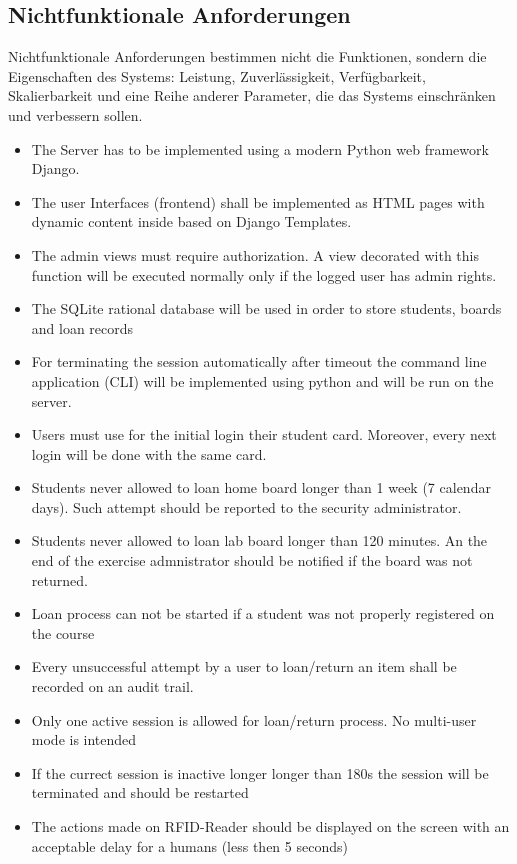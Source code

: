 \subsection{Nichtfunktionale Anforderungen}
Nichtfunktionale Anforderungen bestimmen nicht die Funktionen, sondern die Eigenschaften des Systems: Leistung, Zuverlässigkeit, Verfügbarkeit, Skalierbarkeit und eine Reihe anderer Parameter, die das Systems einschränken und verbessern sollen. 
\label{sec:design:req:non-func}
\begin{itemize}
	\itemsep-1.2em 
	\item The Server has to be implemented using a modern Python web framework Django.
	\item The user Interfaces (frontend) shall be implemented as HTML pages with dynamic content inside based on Django Templates.
	\item The admin views must require authorization. A view decorated with this function will be executed normally only if the logged user has admin rights.
	\item The SQLite rational database will be used in order to store students, boards and loan records
	\item For terminating the session automatically after timeout the command line application (CLI) will be implemented using python and will be run on the server.
	\item Users must use for the initial login their student card. Moreover, every next login will be done with the same card. 
	\item Students never allowed to loan home board longer than 1 week (7 calendar days). Such attempt should be reported to the security administrator.
	\item Students never allowed to loan lab board longer than 120 minutes. An the end of the exercise admnistrator should be notified if the board was not returned.
	\item Loan process can not be started if a student was not properly registered on the course
	\item Every unsuccessful attempt by a user to loan/return an item shall be recorded on an audit trail.
	\item Only one active session is allowed for loan/return process. No multi-user mode is intended
	\item If the currect session is inactive longer longer than 180s the session will be terminated and should be restarted
	\item The actions made on RFID-Reader should be displayed on the screen with an acceptable delay for a humans (less then 5 seconds)
\end{itemize}

